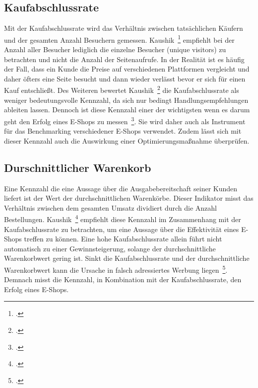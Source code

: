 \subsection{Kaufabschlussrate}
Mit der Kaufabschlussrate wird das Verhältnis zwischen tatsächlichen Käufern und der gesamten Anzahl Besuchern gemessen. Kaushik~\footcite[Vgl. ][Seite 55-56]{Kaushik.2010} empfiehlt bei der Anzahl aller Besucher lediglich die einzelne Besucher (unique visitors) zu betrachten und nicht die Anzahl der Seitenaufrufe. In der Realität ist es häufig der Fall, dass ein Kunde die Preise auf verschiedenen Plattformen vergleicht und daher öfters eine Seite besucht und dann wieder verlässt bevor er sich für einen Kauf entschließt. Des Weiteren bewertet Kaushik~\footcite[Vgl. ][Seite 336-338]{Kaushik.2007} die Kaufabschlussrate als weniger bedeutungsvolle Kennzahl, da sich nur bedingt Handlungsempfehlungen ableiten lassen. Dennoch ist diese Kennzahl einer der wichtigsten wenn es darum geht den Erfolg eines E-Shops zu messen~\footcite[Vgl. ][Seite 31]{Peterson.2006}. Sie wird daher auch als Instrument für das Benchmarking verschiedener E-Shops verwendet. Zudem lässt sich mit dieser Kennzahl auch die Auswirkung einer Optimierungsmaßnahme überprüfen.

\subsection{Durschnittlicher Warenkorb}
Eine Kennzahl die eine Aussage über die Ausgabebereitschaft seiner Kunden liefert ist der Wert der durchschnittlichen Warenkörbe. Dieser Indikator misst das Verhältnis zwischen dem gesamten Umsatz dividiert durch die Anzahl Bestellungen. Kaushik~\footcite[Vgl. ][Seite 153]{Kaushik.2010} empfiehlt diese Kennzahl im Zusammenhang mit der Kaufabschlussrate zu betrachten, um eine Aussage über die Effektivität eines E-Shops treffen zu können. Eine hohe Kaufabschlussrate allein führt nicht automatisch zu einer Gewinnsteigerung, solange der durchschnittliche Warenkorbwert gering ist. Sinkt die Kaufabschlussrate und der durchschnittliche Warenkorbwert kann die Ursache in falsch adressiertes Werbung liegen~\footcite[Vgl. ][Seite 30-31]{Peterson.2006}. Demnach misst die Kennzahl, in Kombination mit der Kaufabschlussrate, den Erfolg eines E-Shops.

